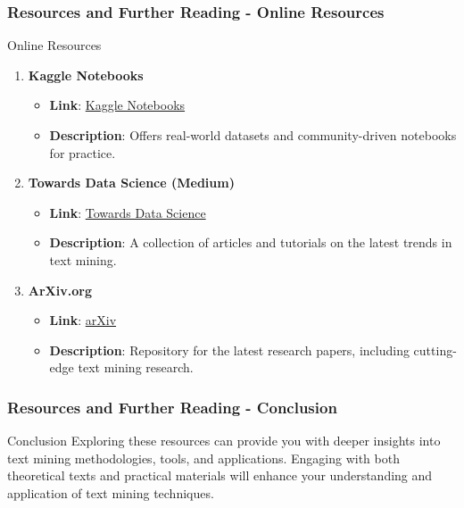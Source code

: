 \documentclass[aspectratio=169]{beamer}
\begin{document}
\begin{frame}[fragile]
    \frametitle{Resources and Further Reading - Online Resources}
    \begin{block}{Online Resources}
        \begin{enumerate}
            \item \textbf{Kaggle Notebooks}
            \begin{itemize}
                \item \textbf{Link}: \href{https://www.kaggle.com/notebooks}{Kaggle Notebooks}
                \item \textbf{Description}: Offers real-world datasets and community-driven notebooks for practice.
            \end{itemize}
            
            \item \textbf{Towards Data Science (Medium)}
            \begin{itemize}
                \item \textbf{Link}: \href{https://towardsdatascience.com/tagged/text-mining}{Towards Data Science}
                \item \textbf{Description}: A collection of articles and tutorials on the latest trends in text mining.
            \end{itemize}
            
            \item \textbf{ArXiv.org}
            \begin{itemize}
                \item \textbf{Link}: \href{https://arxiv.org/}{arXiv}
                \item \textbf{Description}: Repository for the latest research papers, including cutting-edge text mining research.
            \end{itemize}
        \end{enumerate}
    \end{block}
\end{frame}

\begin{frame}[fragile]
    \frametitle{Resources and Further Reading - Conclusion}
    \begin{block}{Conclusion}
        Exploring these resources can provide you with deeper insights into text mining methodologies, tools, and applications. Engaging with both theoretical texts and practical materials will enhance your understanding and application of text mining techniques.
    \end{block}
\end{frame}
\end{document}
